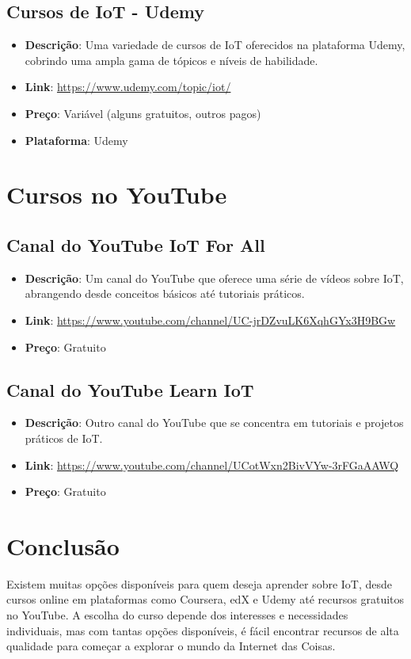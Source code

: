 \documentclass{ufersa}
\begin{document}
\subsection{Cursos de IoT - Udemy}
\begin{itemize}
    \item \textbf{Descrição}: Uma variedade de cursos de IoT oferecidos na plataforma Udemy, cobrindo uma ampla gama de tópicos e níveis de habilidade.
    \item \textbf{Link}: \url{https://www.udemy.com/topic/iot/}
    \item \textbf{Preço}: Variável (alguns gratuitos, outros pagos)
    \item \textbf{Plataforma}: Udemy
\end{itemize}

\section{Cursos no YouTube}

\subsection{Canal do YouTube IoT For All}
\begin{itemize}
    \item \textbf{Descrição}: Um canal do YouTube que oferece uma série de vídeos sobre IoT, abrangendo desde conceitos básicos até tutoriais práticos.
    \item \textbf{Link}: \url{https://www.youtube.com/channel/UC-jrDZvuLK6XqhGYx3H9BGw}
    \item \textbf{Preço}: Gratuito
\end{itemize}

\subsection{Canal do YouTube Learn IoT}
\begin{itemize}
    \item \textbf{Descrição}: Outro canal do YouTube que se concentra em tutoriais e projetos práticos de IoT.
    \item \textbf{Link}: \url{https://www.youtube.com/channel/UCotWxn2BivVYw-3rFGaAAWQ}
    \item \textbf{Preço}: Gratuito
\end{itemize}

\section{Conclusão}
Existem muitas opções disponíveis para quem deseja aprender sobre IoT, desde cursos online em plataformas como Coursera, edX e Udemy até recursos gratuitos no YouTube. A escolha do curso depende dos interesses e necessidades individuais, mas com tantas opções disponíveis, é fácil encontrar recursos de alta qualidade para começar a explorar o mundo da Internet das Coisas.
\end{document}
